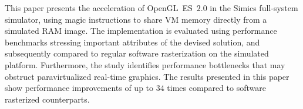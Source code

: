 This paper presents the acceleration of OpenGL~ES~$2.0$ in the Simics full-system simulator, using magic instructions to share VM memory directly from a simulated RAM image.
The implementation is evaluated using performance benchmarks stressing important attributes of the devised solution, and subsequently compared to regular software rasterization on the simulated platform.
Furthermore, the study identifies performance bottlenecks that may obstruct paravirtualized real-time graphics.
The results presented in this paper show performance improvements of up to $34$ times compared to software rasterized counterparts.
